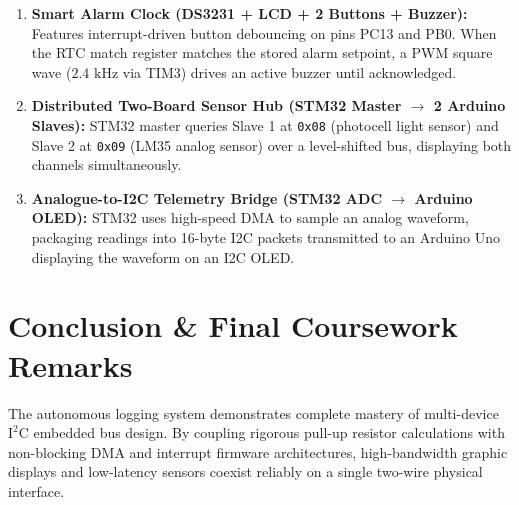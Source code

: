 \documentclass[11pt,a4paper]{article}
\begin{document}
\begin{enumerate}
    \item[\textbf{Option A}] \textbf{Smart Alarm Clock (DS3231 + LCD + 2 Buttons + Buzzer):} Features interrupt-driven button debouncing on pins PC13 and PB0. When the RTC match register matches the stored alarm setpoint, a PWM square wave ($2.4\text{ kHz}$ via TIM3) drives an active buzzer until acknowledged.
    \item[\textbf{Option C}] \textbf{Distributed Two-Board Sensor Hub (STM32 Master $\to$ 2 Arduino Slaves):} STM32 master queries Slave 1 at \texttt{0x08} (photocell light sensor) and Slave 2 at \texttt{0x09} (LM35 analog sensor) over a level-shifted bus, displaying both channels simultaneously.
    \item[\textbf{Option D}] \textbf{Analogue-to-I2C Telemetry Bridge (STM32 ADC $\to$ Arduino OLED):} STM32 uses high-speed DMA to sample an analog waveform, packaging readings into 16-byte I2C packets transmitted to an Arduino Uno displaying the waveform on an I2C OLED.
\end{enumerate}

\section{Conclusion \& Final Coursework Remarks}
The autonomous logging system demonstrates complete mastery of multi-device $\text{I}^2\text{C}$ embedded bus design. By coupling rigorous pull-up resistor calculations with non-blocking DMA and interrupt firmware architectures, high-bandwidth graphic displays and low-latency sensors coexist reliably on a single two-wire physical interface.
\end{document}
